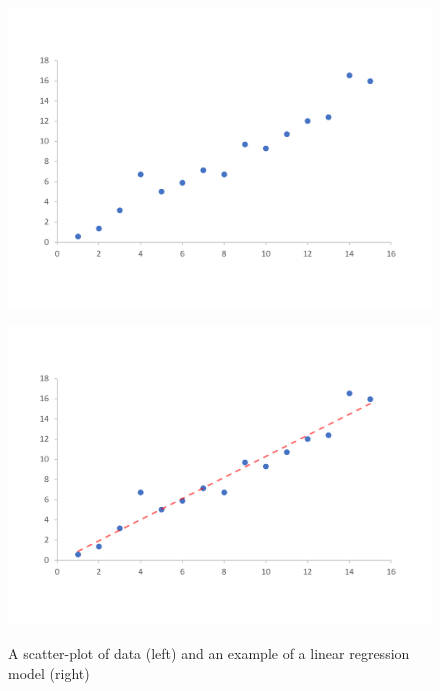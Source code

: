 \documentclass[10pt,a4paper, twocolumn, conference]{IEEEtran}
\begin{document}
\begin{figure}[h]
\begin{center}
\begin{minipage}{0.24\textwidth}
\begin{center}
\includegraphics[width=1.0\textwidth]{data_graph0}
\end{center}
\label{fig:first}
\end{minipage}
\begin{minipage}{0.24\textwidth}
\begin{center}
\includegraphics[width=1.0\textwidth]{data_graph1}
\end{center}
\label{fig:second}
\end{minipage}
\caption{A scatter-plot of data (left) and an example of a linear regression model (right)}
\label{fig:1}
\end{center}
\end{figure}
\end{document}
